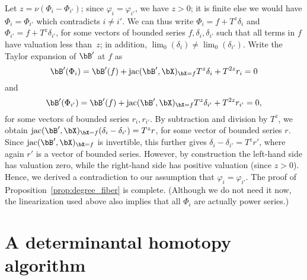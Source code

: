 \documentclass[12pt]{article}
\begin{document}
Let $z=\nu(\Phi_i-\Phi_{i'})$; since $\varphi_i = \varphi_{i'}$, we
have $z > 0$; it is finite else we would have $\Phi_i=\Phi_{i'}$ which
contradicts $i\neq i'$. We can thus write $\Phi_i=f + T^z \delta_i$
and $\Phi_{i'}=f + T^z \delta_{i'}$, for some vectors of bounded
series $f, \delta_i, \delta_{i'}$ such that all terms in $f$ have
valuation less than~$z$; in addition,
$\lim_0(\delta_i) \ne \lim_0(\delta_{i'})$. Write the Taylor expansion
of $\bB'$ at $f$ as
$$\bB'(\Phi_i) = \bB'(f) + \jac(\bB',\bX)_{\bX=f} T^z \delta_i + T^{2z} r_i =0$$
and
$$\bB'(\Phi_{i'}) = \bB'(f) + \jac(\bB',\bX)_{\bX=f} T^z \delta_{i'} + T^{2z}
r_{i'} =0,$$ for some vectors of bounded series $r_i,r_{i'}$.  By
subtraction and division by $T^z$, we obtain
$\jac(\bB',\bX)_{\bX=f} (\delta_i-\delta_{i'}) = T^z r$, for some vector of
bounded series $r$.  Since $\jac(\bB',\bX)_{\bX=f}$ is invertible, this
further gives $\delta_i-\delta_{i'} = T^z r'$, where again $r'$ is a
vector of bounded series.  However, by construction the left-hand side
has valuation zero, while the right-hand side has positive valuation
(since $z > 0$). Hence, we derived a contradiction to our assumption
that $\varphi_i = \varphi_{i'}$. The proof of
Proposition~\ref{prop:degree_fiber} is complete. (Although we do not
need it now, the linearization used above also implies that all
$\Phi_i$ are actually power series.)


\section{A determinantal homotopy algorithm}\label{sec:homotalgo}
\end{document}
